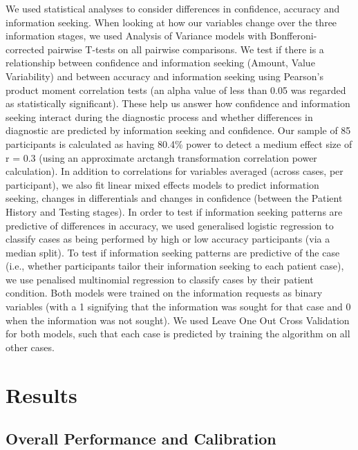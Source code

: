 \documentclass[a4paper, nobind]{templates/ociamthesis}
\begin{document}
\hfill\break
We used statistical analyses to consider differences in confidence, accuracy and information seeking. When looking at how our variables change over the three information stages, we used Analysis of Variance models with Bonfferoni-corrected pairwise T-tests on all pairwise comparisons. We test if there is a relationship between confidence and information seeking (Amount, Value Variability) and between accuracy and information seeking using Pearson's product moment correlation tests (an alpha value of less than 0.05 was regarded as statistically significant). These help us answer how confidence and information seeking interact during the diagnostic process and whether differences in diagnostic are predicted by information seeking and confidence. Our sample of 85 participants is calculated as having 80.4\% power to detect a medium effect size of r = 0.3 (using an approximate arctangh transformation correlation power calculation). In addition to correlations for variables averaged (across cases, per participant), we also fit linear mixed effects models to predict information seeking, changes in differentials and changes in confidence (between the Patient History and Testing stages). In order to test if information seeking patterns are predictive of differences in accuracy, we used generalised logistic regression to classify cases as being performed by high or low accuracy participants (via a median split). To test if information seeking patterns are predictive of the case (i.e., whether participants tailor their information seeking to each patient case), we use penalised multinomial regression to classify cases by their patient condition. Both models were trained on the information requests as binary variables (with a 1 signifying that the information was sought for that case and 0 when the information was not sought). We used Leave One Out Cross Validation for both models, such that each case is predicted by training the algorithm on all other cases.

\section*{Results}\label{results-1}

\subsection*{Overall Performance and Calibration}\label{overall-performance-and-calibration}
\end{document}
